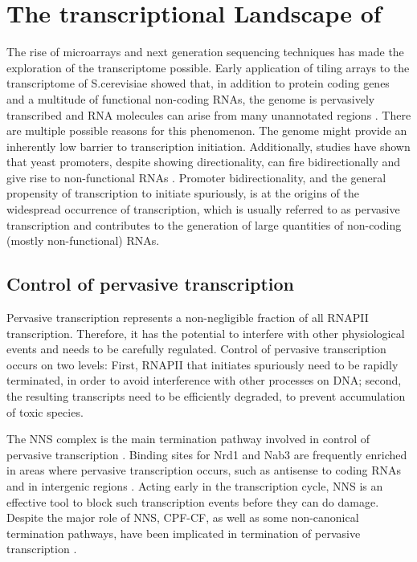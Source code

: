 \chapter{The transcriptional Landscape of \cer{}}
The rise of microarrays and next generation sequencing techniques has made the exploration of the transcriptome possible. 
Early application of tiling arrays to the transcriptome of S.cerevisiae showed that, in addition to protein coding genes and a multitude of functional non-coding RNAs, the genome is pervasively transcribed and RNA molecules can arise from many unannotated regions \cite{xu:2009:bidirectional, neil:2009:widespread,david:2006:highresolution}. 
There are multiple possible reasons for this phenomenon. 
The genome might provide an inherently low barrier to transcription initiation. 
Additionally, studies have shown that yeast promoters, despite showing directionality, can fire bidirectionally and give rise to non-functional RNAs \cite{xu:2009:bidirectional, neil:2009:widespread}. 
Promoter bidirectionality, and the general propensity of transcription to initiate spuriously, is at the origins of the widespread occurrence of transcription, which is usually referred to as pervasive transcription and contributes to the generation of large quantities of non-coding (mostly non-functional) RNAs. 

\section{Control of pervasive transcription}

Pervasive transcription represents a non-negligible fraction of all RNAPII transcription. 
Therefore, it has the potential to interfere with other physiological events and needs to be carefully regulated. 
Control of pervasive transcription occurs on two levels: First, RNAPII that initiates spuriously need to be rapidly terminated, in order to avoid interference with other processes on DNA; second, the resulting transcripts need to be efficiently degraded, to prevent accumulation of toxic species. 

The NNS complex is the main termination pathway involved in control of pervasive transcription \cite{arigo:2006:regulation, thiebaut:2006:transcription}. 
Binding sites for Nrd1 and Nab3 are frequently enriched in areas where pervasive transcription occurs, such as antisense to coding RNAs and in intergenic regions \cite{thiebaut:2006:transcription}. 
Acting early in the transcription cycle, NNS is an effective tool to block such transcription events before they can do damage. 
Despite the major role of NNS, CPF-CF, as well as some non-canonical termination pathways, have been implicated in termination of pervasive transcription \cite{marquardt:2011:distinct, vandijk:2011:xuts,colin:2014:roadblock}.

